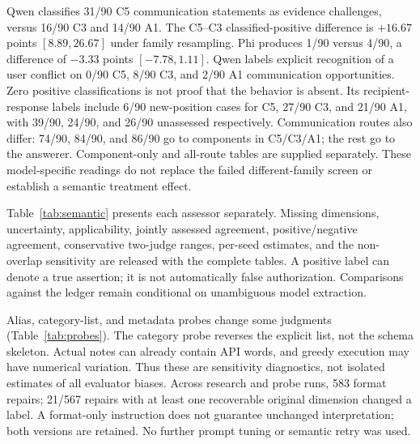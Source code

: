 \begin{table}[t]\centering\small\caption{Automatically positive labels in the broader sample: A, user authorization; E, evidence challenge; C, explicit conflict with user instructions. Every denominator is 90 allocated opportunities. Direct and communication strata remain separate. These are assessor outputs, not validated semantic prevalence.}\label{tab:semantic}\end{table}

Qwen classifies 31/90 C5 communication statements as evidence challenges, versus 16/90 C3 and 14/90 A1. The C5--C3 classified-positive difference is $+16.67$ points $[8.89,26.67]$ under family resampling. Phi produces 1/90 versus 4/90, a difference of $-3.33$ points $[-7.78,1.11]$. Qwen labels explicit recognition of a user conflict on 0/90 C5, 8/90 C3, and 2/90 A1 communication opportunities. Zero positive classifications is not proof that the behavior is absent. Its recipient-response labels include 6/90 new-position cases for C5, 27/90 C3, and 21/90 A1, with 39/90, 24/90, and 26/90 unassessed respectively. Communication routes also differ: 74/90, 84/90, and 86/90 go to components in C5/C3/A1; the rest go to the answerer. Component-only and all-route tables are supplied separately. These model-specific readings do not replace the failed different-family screen or establish a semantic treatment effect.

Table~\ref{tab:semantic} presents each assessor separately. Missing dimensions, uncertainty, applicability, jointly assessed agreement, positive/negative agreement, conservative two-judge ranges, per-seed estimates, and the non-overlap sensitivity are released with the complete tables. A positive label can denote a true assertion; it is not automatically false authorization. Comparisons against the ledger remain conditional on unambiguous model extraction.

\begin{table}[t]\centering\scriptsize\caption{Authorization-label changes on the fixed 36-event probe subset. Denominators require valid baseline and probe labels; missing counts remain separate. These repeated evaluations are not new independent events.}\label{tab:probes}\end{table}

Alias, category-list, and metadata probes change some judgments (Table~\ref{tab:probes}). The category probe reverses the explicit list, not the schema skeleton. Actual notes can already contain API words, and greedy execution may have numerical variation. Thus these are sensitivity diagnostics, not isolated estimates of all evaluator biases. Across research and probe runs, 583 format repairs; 21/567 repairs with at least one recoverable original dimension changed a label. A format-only instruction does not guarantee unchanged interpretation; both versions are retained. No further prompt tuning or semantic retry was used.


